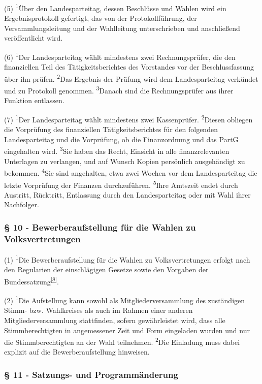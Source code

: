 (5) \textsuperscript{1}Über den Landesparteitag, dessen Beschlüsse und
Wahlen wird ein Ergebnisprotokoll gefertigt, das von der
Protokollführung, der Versammlungsleitung und der Wahlleitung
unterschrieben und anschließend veröffentlicht wird.

(6) \textsuperscript{1}Der Landesparteitag wählt mindestens zwei
Rechnungsprüfer, die den finanziellen Teil des Tätigkeitsberichtes des
Vorstandes vor der Beschlussfassung über ihn prüfen.
\textsuperscript{2}Das Ergebnis der Prüfung wird dem Landesparteitag
verkündet und zu Protokoll genommen. \textsuperscript{3}Danach sind die
Rechnungsprüfer aus ihrer Funktion entlassen.

(7) \textsuperscript{1}Der Landesparteitag wählt mindestens zwei
Kassenprüfer. \textsuperscript{2}Diesen obliegen die Vorprüfung des
finanziellen Tätigkeitsberichtes für den folgenden Landesparteitag und
die Vorprüfung, ob die Finanzordnung und das PartG eingehalten wird.
\textsuperscript{3}Sie haben das Recht, Einsicht in alle
finanzrelevanten Unterlagen zu verlangen, und auf Wunsch Kopien
persönlich ausgehändigt zu bekommen. \textsuperscript{4}Sie sind
angehalten, etwa zwei Wochen vor dem Landesparteitag die letzte
Vorprüfung der Finanzen durchzuführen. \textsuperscript{5}Ihre Amtszeit
endet durch Austritt, Rücktritt, Entlassung durch den Landesparteitag
oder mit Wahl ihrer Nachfolger.

\subsubsection{§ 10 - Bewerberaufstellung für die Wahlen zu
Volksvertretungen}

(1) \textsuperscript{1}Die Bewerberaufstellung für die Wahlen zu
Volksvertretungen erfolgt nach den Regularien der einschlägigen Gesetze
sowie den Vorgaben der
Bundessatzung\textsuperscript{\href{\#cite\_note-7}{{[}8{]}}}.

(2) \textsuperscript{1}Die Aufstellung kann sowohl als
Mitgliederversammlung des zuständigen Stimm- bzw. Wahlkreises als auch
im Rahmen einer anderen Mitgliederversammlung stattfinden, sofern
gewährleistet wird, dass alle Stimmberechtigten in angemessener Zeit und
Form eingeladen wurden und nur die Stimmberechtigten an der Wahl
teilnehmen. \textsuperscript{2}Die Einladung muss dabei explizit auf die
Bewerberaufstellung hinweisen.

\subsubsection{§ 11 - Satzungs- und Programmänderung}

